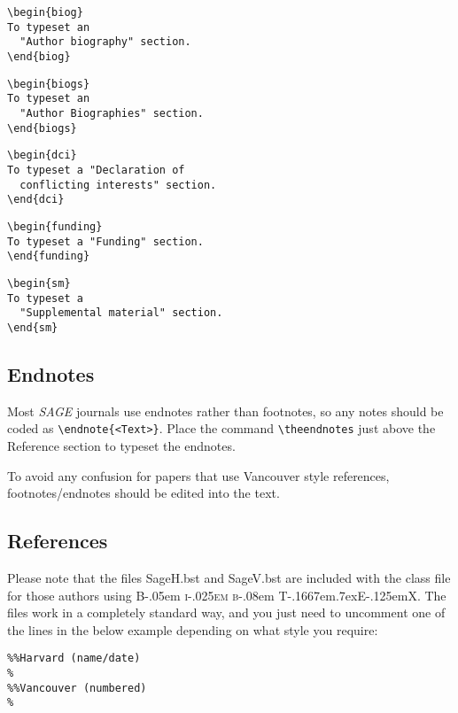 \documentclass[Afour,sageh,times]{sagej}
\newcommand\BibTeX{{\rmfamily B\kern-.05em \textsc{i\kern-.025em b}\kern-.08em
T\kern-.1667em\lower.7ex\hbox{E}\kern-.125emX}}
\begin{document}
\begin{verbatim}
\begin{biog}
To typeset an
  "Author biography" section.
\end{biog}
\end{verbatim}

\begin{verbatim}
\begin{biogs}
To typeset an
  "Author Biographies" section.
\end{biogs}
\end{verbatim}


\begin{verbatim}
\begin{dci}
To typeset a "Declaration of
  conflicting interests" section.
\end{dci}
\end{verbatim}

\begin{verbatim}
\begin{funding}
To typeset a "Funding" section.
\end{funding}
\end{verbatim}

\begin{verbatim}
\begin{sm}
To typeset a
  "Supplemental material" section.
\end{sm}
\end{verbatim}

\subsection{Endnotes}
Most \textit{SAGE} journals use endnotes rather than footnotes, so any notes should be coded as \verb+\endnote{<Text>}+.
Place the command \verb+\theendnotes+ just above the Reference section to typeset the endnotes.

To avoid any confusion for papers that use Vancouver style references,  footnotes/endnotes should be edited into the text.

\subsection{References}
Please note that the files \textsf{SageH.bst} and \textsf{SageV.bst} are included with the class file
for those authors using \BibTeX. 
The files work in a completely standard way, and you just need to uncomment one of the lines in the below example depending on what style you require:
\begin{verbatim}
%%Harvard (name/date)
%
%%Vancouver (numbered)
% 
 
\end{verbatim}
\end{document}
